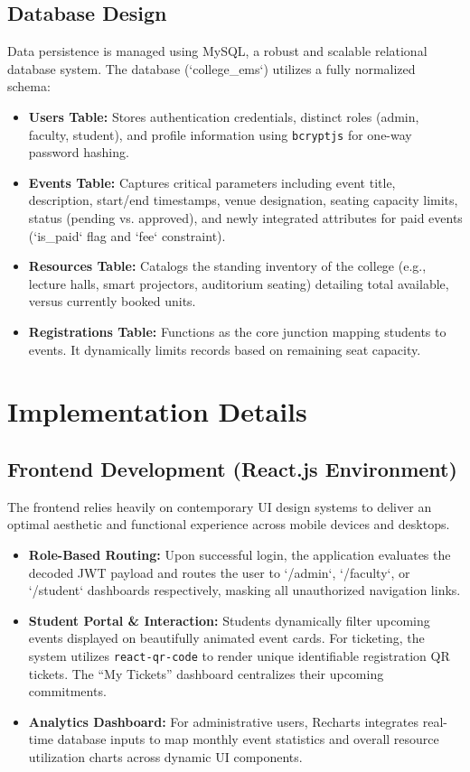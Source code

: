 \documentclass[12pt, a4paper]{report}
\begin{document}
\section{Database Design}
Data persistence is managed using MySQL, a robust and scalable relational database system. The database (`college\_ems`) utilizes a fully normalized schema:
\begin{itemize}
    \item \textbf{Users Table:} Stores authentication credentials, distinct roles (admin, faculty, student), and profile information using \texttt{bcryptjs} for one-way password hashing.
    \item \textbf{Events Table:} Captures critical parameters including event title, description, start/end timestamps, venue designation, seating capacity limits, status (pending vs. approved), and newly integrated attributes for paid events (`is\_paid` flag and `fee` constraint).
    \item \textbf{Resources Table:} Catalogs the standing inventory of the college (e.g., lecture halls, smart projectors, auditorium seating) detailing total available, versus currently booked units.
    \item \textbf{Registrations Table:} Functions as the core junction mapping students to events. It dynamically limits records based on remaining seat capacity. 
\end{itemize}

\chapter{Implementation Details}

\section{Frontend Development (React.js Environment)}
The frontend relies heavily on contemporary UI design systems to deliver an optimal aesthetic and functional experience across mobile devices and desktops.
\begin{itemize}
    \item \textbf{Role-Based Routing:} Upon successful login, the application evaluates the decoded JWT payload and routes the user to `/admin`, `/faculty`, or `/student` dashboards respectively, masking all unauthorized navigation links.
    \item \textbf{Student Portal \& Interaction:} Students dynamically filter upcoming events displayed on beautifully animated event cards. For ticketing, the system utilizes \texttt{react-qr-code} to render unique identifiable registration QR tickets. The ``My Tickets'' dashboard centralizes their upcoming commitments.
    \item \textbf{Analytics Dashboard:} For administrative users, Recharts integrates real-time database inputs to map monthly event statistics and overall resource utilization charts across dynamic UI components.
\end{itemize}
\end{document}
